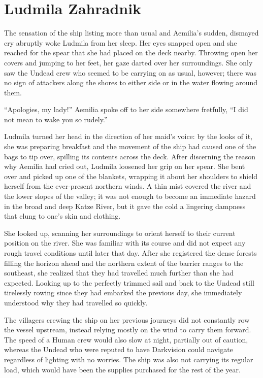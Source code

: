 \chapter{Ludmila Zahradnik}

The sensation of the ship listing more than usual and Aemilia’s sudden, dismayed cry abruptly woke Ludmila from her sleep. Her eyes snapped open and she reached for the spear that she had placed on the deck nearby. Throwing open her covers and jumping to her feet, her gaze darted over her surroundings. She only saw the Undead crew who seemed to be carrying on as usual, however; there was no sign of attackers along the shores to either side or in the water flowing around them.

 

“Apologies, my lady!” Aemilia spoke off to her side somewhere fretfully, “I did not mean to wake you so rudely.”

 

Ludmila turned her head in the direction of her maid's voice: by the looks of it, she was preparing breakfast and the movement of the ship had caused one of the bags to tip over, spilling its contents across the deck. After discerning the reason why Aemilia had cried out, Ludmila loosened her grip on her spear. She bent over and picked up one of the blankets, wrapping it about her shoulders to shield herself from the ever-present northern winds. A thin mist covered the river and the lower slopes of the valley; it was not enough to become an immediate hazard in the broad and deep Katze River, but it gave the cold a lingering dampness that clung to one’s skin and clothing.

 

She looked up, scanning her surroundings to orient herself to their current position on the river. She was familiar with its course and did not expect any rough travel conditions until later that day. After she registered the dense forests filling the horizon ahead and the northern extent of the barrier ranges to the southeast, she realized that they had travelled much further than she had expected. Looking up to the perfectly trimmed sail and back to the Undead still tirelessly rowing since they had embarked the previous day, she immediately understood why they had travelled so quickly.

 

The villagers crewing the ship on her previous journeys did not constantly row the vessel upstream, instead relying mostly on the wind to carry them forward. The speed of a Human crew would also slow at night, partially out of caution, whereas the Undead who were reputed to have Darkvision could navigate regardless of lighting with no worries. The ship was also not carrying its regular load, which would have been the supplies purchased for the rest of the year.

